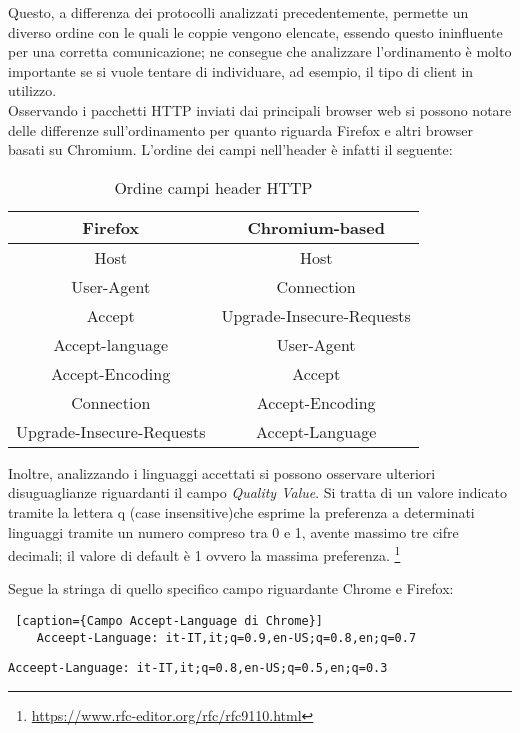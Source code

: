 Questo, a differenza dei protocolli analizzati precedentemente, permette un diverso ordine con le quali le coppie vengono elencate, essendo questo ininfluente per una corretta comunicazione; ne consegue che analizzare l'ordinamento è molto importante se si vuole tentare di individuare, ad esempio, il tipo di client in utilizzo.\\

Osservando i pacchetti HTTP inviati dai principali browser web si possono notare delle differenze sull'ordinamento per quanto riguarda Firefox e altri browser basati su Chromium.
L'ordine dei campi nell'header è infatti il seguente:

\begin{table}[h]
	\centering
	\begin{tabular}{| c | c |}
		\hline
		\textbf{Firefox} & \textbf{Chromium-based}
		\\
		\hline
		Host & Host
		\\
		\hline
		User-Agent & Connection
		\\
		\hline
		Accept & Upgrade-Insecure-Requests
		\\
		\hline
		Accept-language & User-Agent
		\\
		\hline
		Accept-Encoding & Accept
		\\
		\hline
		Connection & Accept-Encoding
		\\
		\hline
		Upgrade-Insecure-Requests & Accept-Language
		\\
		\hline
	\end{tabular}
	\caption{Ordine campi header HTTP}
	\label{tab:ordineHTTP}
\end{table}

Inoltre, analizzando i linguaggi accettati si possono osservare ulteriori disuguaglianze riguardanti il campo \textit{Quality Value}.
Si tratta di un valore indicato tramite la lettera q (case insensitive)che esprime la preferenza a determinati linguaggi tramite un numero compreso tra 0 e 1, avente massimo tre cifre decimali; il valore di default è 1 ovvero la massima preferenza. \footnote{\url{https://www.rfc-editor.org/rfc/rfc9110.html}}

Segue la stringa di quello specifico campo riguardante Chrome e Firefox:

\begin{lstlisting} [caption={Campo Accept-Language di Chrome}]
	Acceept-Language: it-IT,it;q=0.9,en-US;q=0.8,en;q=0.7
\end{lstlisting}

\begin{lstlisting}[caption={Campo Accept-Language di Firefox}]
	Acceept-Language: it-IT,it;q=0.8,en-US;q=0.5,en;q=0.3
\end{lstlisting}

